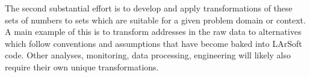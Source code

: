 \documentclass[pdftex,12pt,letter]{article}
\begin{document}
The second substantial effort is to develop and apply transformations
of these sets of numbers to sets which are suitable for a given
problem domain or context.  A main example of this is to transform
addresses in the raw data to alternatives which follow conventions and
assumptions that have become baked into LArSoft code.  Other analyses,
monitoring, data processing, engineering will likely also require
their own unique transformations.
\end{document}
